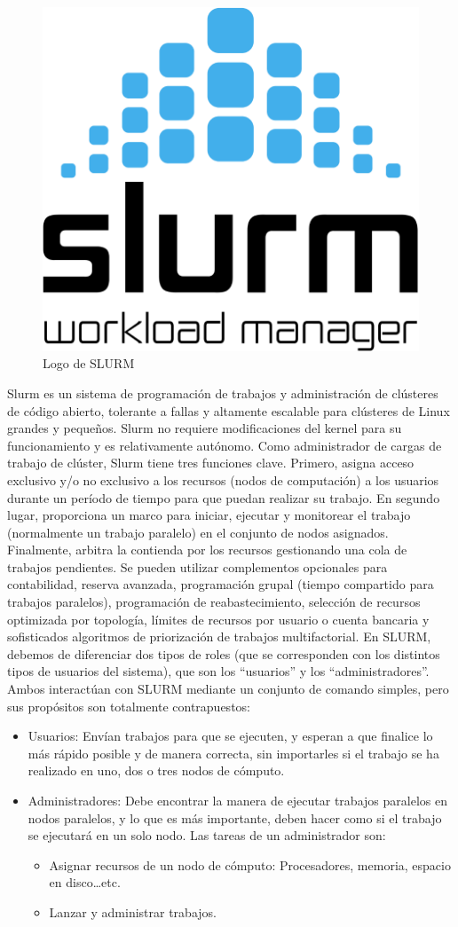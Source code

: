 \begin{figure}[h]
    \centering
    \includegraphics[width=.5\textwidth]{images/slurm.png}
    \caption{Logo de SLURM}
    \label{fig:img3}
\end{figure}

Slurm es un sistema de programación de trabajos y administración de clústeres de código abierto, tolerante a fallas y altamente escalable para clústeres de Linux grandes y pequeños. Slurm no requiere modificaciones del kernel para su funcionamiento y es relativamente autónomo. Como administrador de cargas de trabajo de clúster, Slurm tiene tres funciones clave. Primero, asigna acceso exclusivo y/o no exclusivo a los recursos (nodos de computación) a los usuarios durante un período de tiempo para que puedan realizar su trabajo. En segundo lugar, proporciona un marco para iniciar, ejecutar y monitorear el trabajo (normalmente un trabajo paralelo) en el conjunto de nodos asignados. Finalmente, arbitra la contienda por los recursos gestionando una cola de trabajos pendientes. Se pueden utilizar complementos opcionales para contabilidad, reserva avanzada, programación grupal (tiempo compartido para trabajos paralelos), programación de reabastecimiento, selección de recursos optimizada por topología, límites de recursos por usuario o cuenta bancaria y sofisticados algoritmos de priorización de trabajos multifactorial.
En SLURM, debemos de diferenciar dos tipos de roles (que se corresponden con los distintos tipos de usuarios del sistema), que son los “usuarios” y los “administradores”. Ambos interactúan con SLURM mediante un conjunto de comando simples, pero sus propósitos son totalmente contrapuestos:

\begin{itemize}
\item Usuarios: Envían trabajos para que se ejecuten, y esperan a que finalice lo más rápido posible y de manera correcta, sin importarles si el trabajo se ha realizado en uno, dos o tres nodos de cómputo.
\item Administradores: Debe encontrar la manera de ejecutar trabajos paralelos en nodos paralelos, y lo que es más importante, deben hacer como si el trabajo se ejecutará en un solo nodo. Las tareas de un administrador son:
\begin{itemize}
\item Asignar recursos de un nodo de cómputo: Procesadores, memoria, espacio en disco…etc.
\item Lanzar y administrar trabajos.
\end{itemize}
\end{itemize}

